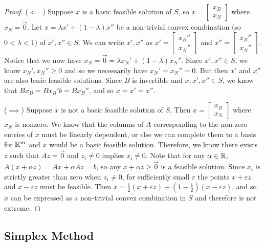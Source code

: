 \begin{proof}\proofbreak
    ($\impliedby$) Suppose $x$ is a basic feasible solution of $S$, so $x = \begin{bmatrix}
        x_B \\ x_N
    \end{bmatrix}$ where $x_N = \vec{0}$. Let $x = \lambda x' + (1 - \lambda) x''$ be a non-trivial convex combination (so $0 < \lambda < 1$) of $x', x'' \in S$. We can write $x', x''$ as $x' = \begin{bmatrix} x_B'' \\ x_N'' \end{bmatrix}$ and $x'' = \begin{bmatrix} x_B'' \\ x_N'' \end{bmatrix}$. Notice that we now have $x_N = \vec{0} = \lambda x_N' + (1 - \lambda)x_N''$. Since $x', x'' \in S$, we know $x_N', x_N'' \geq 0$ and so we necessarily have $x_N' = x_N'' = 0$. But then $x'$ and $x''$ are also basic feasible solutions. Since $B$ is invertible and $x, x', x'' \in S$, we know that $Bx_B = Bx_B'b = Bx_B''$, and so $x = x' = x''$.

    ($\implies$) Suppose $x$ is not a basic feasible solution of $S$. Then $x = \begin{bmatrix}
        x_B \\ x_N
    \end{bmatrix}$ where $x_N$ is nonzero. We know that the columns of $A$ corresponding to the non-zero entries of $x$ must be linearly dependent, or else we can complete them to a basis for $\mathbb{R}^m$ and $x$ would be a basic feasible solution. Therefore, we know there exists $z$ such that $Az = \vec{0}$ and $z_i \neq 0$ implies $x_i \neq 0$. Note that for any $\alpha \in \mathbb{R}$, $A(x + \alpha z) = Ax + \alpha Az = b$, so any $x + \alpha z \geq \vec{0}$ is a feasible solution. Since $x_i$ is strictly greater than zero when $z_i \neq 0$, for sufficiently small $\varepsilon$ the points $x + \varepsilon z$ and $x - \varepsilon z$ must be feasible. Then $x = \frac{1}{2}\left(x + \varepsilon z\right) + \left(1 - \frac{1}{2}\right)\left(x - \varepsilon z\right)$, and so $x$ can be expressed as a non-trivial convex combination in $S$ and therefore is not extreme.
\end{proof}

\subsection{Simplex Method}

